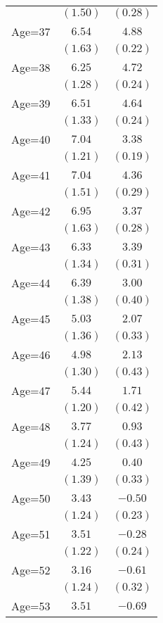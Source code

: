 \documentclass[fullpage]{paper}
\begin{document}
\begin{center}
\begin{longtable}{l c c }
            & $(1.50)$ & $(0.28)$ \\
Age=37      & $6.54$   & $4.88$   \\
            & $(1.63)$ & $(0.22)$ \\
Age=38      & $6.25$   & $4.72$   \\
            & $(1.28)$ & $(0.24)$ \\
Age=39      & $6.51$   & $4.64$   \\
            & $(1.33)$ & $(0.24)$ \\
Age=40      & $7.04$   & $3.38$   \\
            & $(1.21)$ & $(0.19)$ \\
Age=41      & $7.04$   & $4.36$   \\
            & $(1.51)$ & $(0.29)$ \\
Age=42      & $6.95$   & $3.37$   \\
            & $(1.63)$ & $(0.28)$ \\
Age=43      & $6.33$   & $3.39$   \\
            & $(1.34)$ & $(0.31)$ \\
Age=44      & $6.39$   & $3.00$   \\
            & $(1.38)$ & $(0.40)$ \\
Age=45      & $5.03$   & $2.07$   \\
            & $(1.36)$ & $(0.33)$ \\
Age=46      & $4.98$   & $2.13$   \\
            & $(1.30)$ & $(0.43)$ \\
Age=47      & $5.44$   & $1.71$   \\
            & $(1.20)$ & $(0.42)$ \\
Age=48      & $3.77$   & $0.93$   \\
            & $(1.24)$ & $(0.43)$ \\
Age=49      & $4.25$   & $0.40$   \\
            & $(1.39)$ & $(0.33)$ \\
Age=50      & $3.43$   & $-0.50$  \\
            & $(1.24)$ & $(0.23)$ \\
Age=51      & $3.51$   & $-0.28$  \\
            & $(1.22)$ & $(0.24)$ \\
Age=52      & $3.16$   & $-0.61$  \\
            & $(1.24)$ & $(0.32)$ \\
Age=53      & $3.51$   & $-0.69$  \\

\end{longtable}
\end{center}
\end{document}
